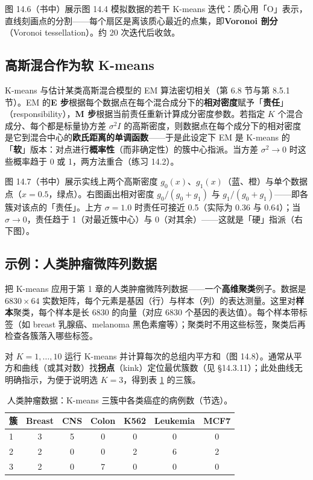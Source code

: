 图 14.6（书中）展示图 14.4 模拟数据的若干 K-means 迭代：质心用「O」表示，直线刻画点的分割——每个扇区是离该质心最近的点集，即\textbf{Voronoi 剖分}（Voronoi tessellation）。约 20 次迭代后收敛。

\subsection{高斯混合作为软 K-means}

K-means 与估计某类高斯混合模型的 EM 算法密切相关（第 6.8 节与第 8.5.1 节）。EM 的\textbf{E 步}根据每个数据点在每个混合成分下的\textbf{相对密度}赋予「\textbf{责任}」（responsibility），\textbf{M 步}根据当前责任重新计算成分密度参数。若指定 $K$ 个混合成分、每个都是标量协方差 $\sigma^2 I$ 的高斯密度，则数据点在每个成分下的相对密度是它到混合中心的\textbf{欧氏距离的单调函数}——于是此设定下 EM 是 K-means 的「\textbf{软}」版本：对点进行\textbf{概率性}（而非确定性）的簇中心指派。当方差 $\sigma^2\to 0$ 时这些概率趋于 0 或 1，两方法重合（练习 14.2）。

\begin{remark}
图 14.7（书中）展示实线上两个高斯密度 $g_0(x)$、$g_1(x)$（蓝、橙）与单个数据点（$x=0.5$，绿点）。右图画出相对密度 $g_0/(g_0+g_1)$ 与 $g_1/(g_0+g_1)$——即各簇对该点的「责任」。上方 $\sigma=1.0$ 时责任可接近 0.5（实际为 0.36 与 0.64）；当 $\sigma\to 0$，责任趋于 1（对最近簇中心）与 0（对其余）——这就是「硬」指派（右下图）。
\end{remark}

\subsection{示例：人类肿瘤微阵列数据}

把 K-means 应用于第 1 章的人类肿瘤微阵列数据——一个\textbf{高维聚类}例子。数据是 $6830\times 64$ 实数矩阵，每个元素是基因（行）与样本（列）的表达测量。这里对\textbf{样本}聚类，每个样本是长 6830 的向量（对应 6830 个基因的表达值）。每个样本带标签（如 breast 乳腺癌、melanoma 黑色素瘤等）；聚类时不用这些标签，聚类后再检查各簇落入哪些标签。

对 $K=1,\dots,10$ 运行 K-means 并计算每次的总组内平方和（图 14.8）。通常从平方和曲线（或其对数）找\textbf{拐点}（kink）定位最优簇数（见 §14.3.11）；此处曲线无明确指示，为便于说明选 $K=3$，得到表 \ref{tab:14_2} 的三簇。

\begin{table}[htbp]
\centering
\caption{人类肿瘤数据：K-means 三簇中各类癌症的病例数（节选）。}
\label{tab:14_2}
\begin{tabular}{lcccccc}
\toprule
簇 & Breast & CNS & Colon & K562 & Leukemia & MCF7 \\
\midrule
1 & 3 & 5 & 0 & 0 & 0 & 0 \\
2 & 2 & 0 & 0 & 2 & 6 & 2 \\
3 & 2 & 0 & 7 & 0 & 0 & 0 \\
\bottomrule
\end{tabular}
\end{table}

